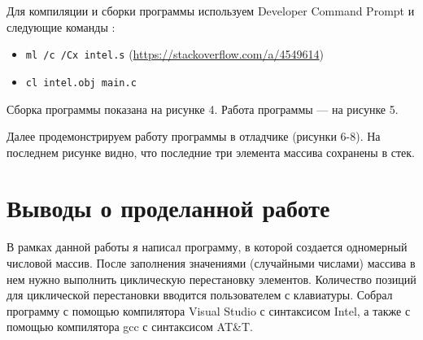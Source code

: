 Для компиляции и сборки программы используем Developer Command Prompt и следующие команды \cite{cli}:
\begin{itemize}
    \item \texttt{ml /c /Cx intel.s} (\url{https://stackoverflow.com/a/4549614})
    \item \texttt{cl intel.obj main.c}
\end{itemize} 

Сборка программы показана на рисунке 4. Работа программы — на рисунке 5.

\FloatBarrier

Далее продемонстрируем работу программы в отладчике (рисунки 6-8). На последнем рисунке видно, что последние три элемента массива сохранены в стек.

\FloatBarrier

\clearpage

\section{Выводы о проделанной работе}
В рамках данной работы я написал программу, в которой создается одномерный числовой массив. После заполнения значениями (случайными числами) массива в нем нужно выполнить циклическую перестановку элементов. Количество позиций для циклической перестановки вводится пользователем с клавиатуры. Собрал программу с помощью компилятора Visual Studio с синтаксисом Intel, а также с помощью компилятора gcc с синтаксисом AT\&T.

\clearpage